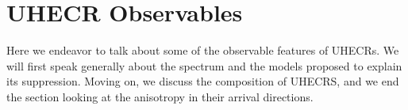 
\section{UHECR Observables}
Here we endeavor to talk about some of the observable features of UHECRs. We will first speak generally about the spectrum and the models proposed to explain its suppression. Moving on, we discuss the composition of UHECRS, and we end the section looking at the anisotropy in their arrival directions.

